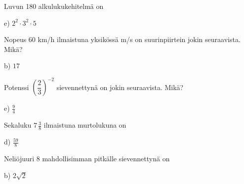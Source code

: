 \begin{tehtava}
Luvun 180 alkulukukehitelmä on
\begin{alakohdat}
\end{alakohdat}
	\begin{vastaus}
	 e) $2^2\cdot3^2\cdot5$
	\end{vastaus}
\end{tehtava}

\begin{tehtava}
Nopeus 60 km/h ilmaistuna yksikössä m/s on suurinpiirtein jokin seuraavista. Mikä?
\begin{alakohdat}
\end{alakohdat}
	\begin{vastaus}
	 b) $17$
	\end{vastaus}
\end{tehtava}

\begin{tehtava}
Potenssi $\left( \dfrac{2}{3} \right)^{-2}$ sievennettynä on jokin seuraavista. Mikä?
\begin{alakohdat}
\end{alakohdat}
\begin{vastaus}
e) $\frac{9}{4}$
\end{vastaus}
\end{tehtava}

\begin{tehtava}
Sekaluku $7\,\frac{3}{8}$ ilmaistuna murtolukuna on
\begin{alakohdat}
\end{alakohdat}
    \begin{vastaus}
	 d) $\frac{59}{8}$
    \end{vastaus}
\end{tehtava}

\begin{tehtava}
Neliöjuuri 8 mahdollisimman pitkälle sievennettynä on
\begin{alakohdat}
\end{alakohdat}

  \begin{vastaus}
	 b) $2\sqrt{2}$
    \end{vastaus}
\end{tehtava}

